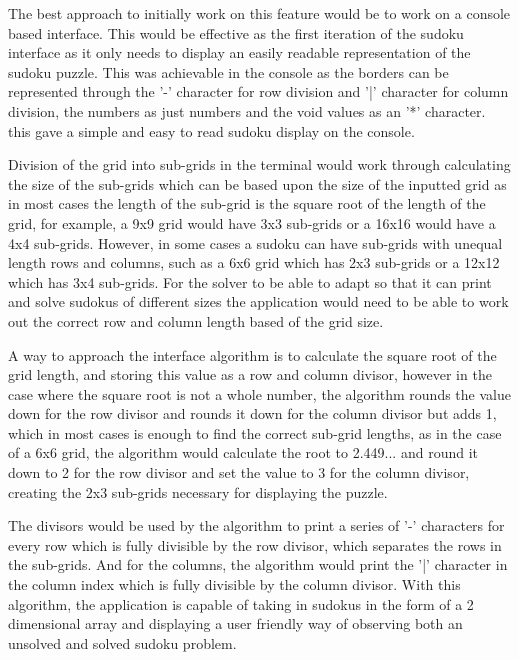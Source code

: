 \documentclass[]{final_report}
\begin{document}
The best approach to initially work on this feature would be to work on a console based interface. This would be effective as the first iteration of the sudoku interface as it only needs to display an easily readable representation of the sudoku puzzle. This was achievable in the console as the borders can be represented through the '-' character for row division and '|' character for column division, the numbers as just numbers and the void values as an '*' character. this gave a simple and easy to read sudoku display on the console.

Division of the grid into sub-grids in the terminal would work through calculating the size of the sub-grids which can be based upon the size of the inputted grid as in most cases the length of the sub-grid is the square root of the length of the grid, for example, a 9x9 grid would have 3x3 sub-grids or a 16x16 would have a 4x4 sub-grids. However, in some cases a sudoku can have sub-grids with unequal length rows and columns, such as a 6x6 grid which has 2x3 sub-grids or a 12x12 which has 3x4 sub-grids. For the solver to be able to adapt so that it can print and solve sudokus of different sizes the application would need to be able to work out the correct row and column length based of the grid size. 

A way to approach the interface algorithm is to calculate the square root of the grid length, and storing this value as a row and column divisor, however in the case where the square root is not a whole number, the algorithm rounds the value down for the row divisor and rounds it down for the column divisor but adds 1, which in most cases is enough to find the correct sub-grid lengths, as in the case of a 6x6 grid, the algorithm would calculate the root to 2.449... and round it down to 2 for the row divisor and set the value to 3 for the column divisor, creating the 2x3 sub-grids necessary for displaying the puzzle. 

The divisors would be used by the algorithm to print a series of '-' characters for every row which is fully divisible by the row divisor, which separates the rows in the sub-grids. And for the columns, the algorithm would print the '|' character in the column index which is fully divisible by the column divisor. With this algorithm, the application is capable of taking in sudokus in the form of a 2 dimensional array and displaying a user friendly way of observing both an unsolved and solved sudoku problem. 
\end{document}

